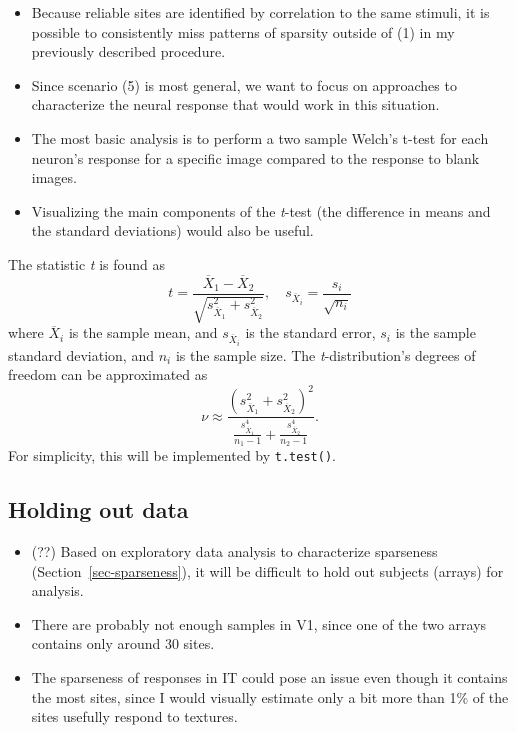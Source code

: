 \documentclass[
  11pt,
  letterpaper,
  DIV=11,
  numbers=noendperiod]{scrartcl}
\providecommand{\tightlist}{%
  \setlength{\itemsep}{0pt}\setlength{\parskip}{0pt}}
\begin{document}
\begin{itemize}
\tightlist
\item
  Because reliable sites are identified by correlation to the same
  stimuli, it is possible to consistently miss patterns of sparsity
  outside of (1) in my previously described procedure.
\item
  Since scenario (5) is most general, we want to focus on approaches to
  characterize the neural response that would work in this situation.
\item
  The most basic analysis is to perform a two sample Welch's t-test for
  each neuron's response for a specific image compared to the response
  to blank images.
\item
  Visualizing the main components of the \emph{t}-test (the difference
  in means and the standard deviations) would also be useful.
\end{itemize}

The statistic \emph{t} is found as \[
t = \frac
{ \overline{X}_1 - \overline{X}_2 }
{ \sqrt{s^2_{\overline{X}_1} + s^2_{\overline{X}_2}} }, 
\quad 
s_{\overline{X}_i} = \frac{s_i}{\sqrt{n_i}}
\] where \(\overline{X}_i\) is the sample mean, and
\(s_{\overline{X}_i}\) is the standard error, \(s_i\) is the sample
standard deviation, and \(n_i\) is the sample size. The
\emph{t}-distribution's degrees of freedom can be approximated as \[
\nu \approx \frac
{ \left( s^2_{\overline{X}_1} + s^2_{\overline{X}_2} \right)^2 }
{ \frac{s^4_{\overline{X}_1}}{n_1 - 1} + \frac{s^4_{\overline{X}_2}}{n_2 - 1} }.
\] For simplicity, this will be implemented by \texttt{t.test()}.

\subsection{Holding out data}\label{holding-out-data}

\begin{itemize}
\tightlist
\item
  (??) Based on exploratory data analysis to characterize sparseness
  (Section~\ref{sec-sparseness}), it will be difficult to hold out
  subjects (arrays) for analysis.
\item
  There are probably not enough samples in V1, since one of the two
  arrays contains only around 30 sites.
\item
  The sparseness of responses in IT could pose an issue even though it
  contains the most sites, since I would visually estimate only a bit
  more than 1\% of the sites usefully respond to textures.
\end{itemize}
\end{document}
